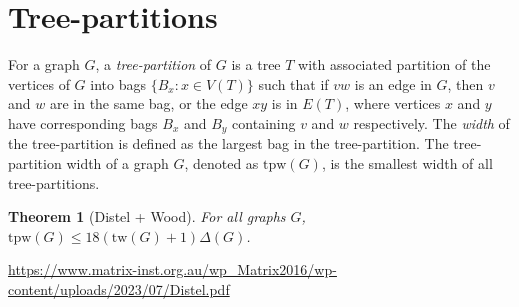 \documentclass[]{article}
\newcommand{\tw}{\text{tw}}
\newtheorem{theorem}{Theorem}
\theoremstyle{definition}
\numberwithin{theorem}{section}
\numberwithin{equation}{section}
\begin{document}
\section{Tree-partitions}
\newcommand{\tpw}{\text{tpw}}

For a graph $G$, a \textit{tree-partition} of $G$ is a tree $T$ with associated partition of the vertices of $G$ into bags $ \lbrace B_x : x \in V(T) \rbrace$ such that if $vw$ is an edge in $G$, then $v$ and $w$ are in the same bag, or the edge $xy$ is in $E(T)$, where vertices $x$ and $y$ have corresponding bags $B_x$ and $B_y$ containing $v$ and $w$ respectively. The \textit{width} of the tree-partition is defined as the largest bag in the tree-partition. The tree-partition width of a graph $G$, denoted as $\tpw(G)$, is the smallest width of all tree-partitions. 


\begin{theorem}[Distel + Wood]
	For all graphs $G$, $\tpw(G) \leq 18 (\tw(G) + 1) \Delta(G)$. 
\end{theorem}
\url{https://www.matrix-inst.org.au/wp_Matrix2016/wp-content/uploads/2023/07/Distel.pdf}
\end{document}
